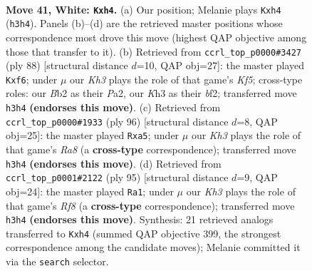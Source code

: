 \documentclass[11pt]{article}
\begin{document}
\clearpage

\begin{figure}[p]\centering
\begin{subfigure}{0.46\textwidth}\centering
\resizebox{\linewidth}{!}{%
\newchessgame
\chessboard[
  setfen={5k2/8/8/2P3r1/7p/7K/1B1N4/8 w - - 0 41},
  showmover=false,
  pgfstyle=straightmove, color=movearrow, markmove={h3-h4}
]}
\caption{}
\end{subfigure}\hfill
\begin{subfigure}{0.46\textwidth}\centering
\resizebox{\linewidth}{!}{%
\newchessgame
\chessboard[
  setfen={8/1k6/5p2/5K2/8/6P1/P4b2/8 w - - 2 45},
  showmover=false,
  pgfstyle=straightmove, color=movearrow, markmove={f5-f6}
]}
\caption{}
\end{subfigure}
\\[4pt]
\begin{subfigure}{0.46\textwidth}\centering
\resizebox{\linewidth}{!}{%
\newchessgame
\chessboard[
  setfen={R7/8/6k1/p7/K7/5r1P/8/8 w - - 5 49},
  showmover=false,
  pgfstyle=straightmove, color=movearrow, markmove={a8-a5}
]}
\caption{}
\end{subfigure}\hfill
\begin{subfigure}{0.46\textwidth}\centering
\resizebox{\linewidth}{!}{%
\newchessgame
\chessboard[
  setfen={8/7R/8/5k2/5P1p/8/3K4/5r2 b - - 4 48},
  showmover=false,
  pgfstyle=straightmove, color=movearrow, markmove={f1-a1}
]}
\caption{}
\end{subfigure}
\caption{\textbf{Move 41, White: \texttt{Kxh4}.} (a) Our position; Melanie plays \texttt{Kxh4} (\texttt{h3h4}). Panels (b)--(d) are the retrieved master positions whose correspondence most drove this move (highest QAP objective among those that transfer to it). (b) Retrieved from \texttt{ccrl\_top\_p0000\#3427} (ply 88) [structural distance $d$=10, QAP obj=27]: the master played \texttt{Kxf6}; under $\mu$ our \emph{Kh3} plays the role of that game's \emph{Kf5}; cross-type roles: our \emph{B}b2 as their \emph{P}a2, our \emph{K}h3 as their \emph{b}f2; transferred move \texttt{h3h4} \textbf{(endorses this move)}. (c) Retrieved from \texttt{ccrl\_top\_p0000\#1933} (ply 96) [structural distance $d$=8, QAP obj=25]: the master played \texttt{Rxa5}; under $\mu$ our \emph{Kh3} plays the role of that game's \emph{Ra8} (a \textbf{cross-type} correspondence); transferred move \texttt{h3h4} \textbf{(endorses this move)}. (d) Retrieved from \texttt{ccrl\_top\_p0001\#2122} (ply 95) [structural distance $d$=9, QAP obj=24]: the master played \texttt{Ra1}; under $\mu$ our \emph{Kh3} plays the role of that game's \emph{Rf8} (a \textbf{cross-type} correspondence); transferred move \texttt{h3h4} \textbf{(endorses this move)}. Synthesis: 21 retrieved analogs transferred to \texttt{Kxh4} (summed QAP objective 399, the strongest correspondence among the candidate moves); Melanie committed it via the \texttt{search} selector.}
\label{fig:thought-m80}
\end{figure}
\end{document}
